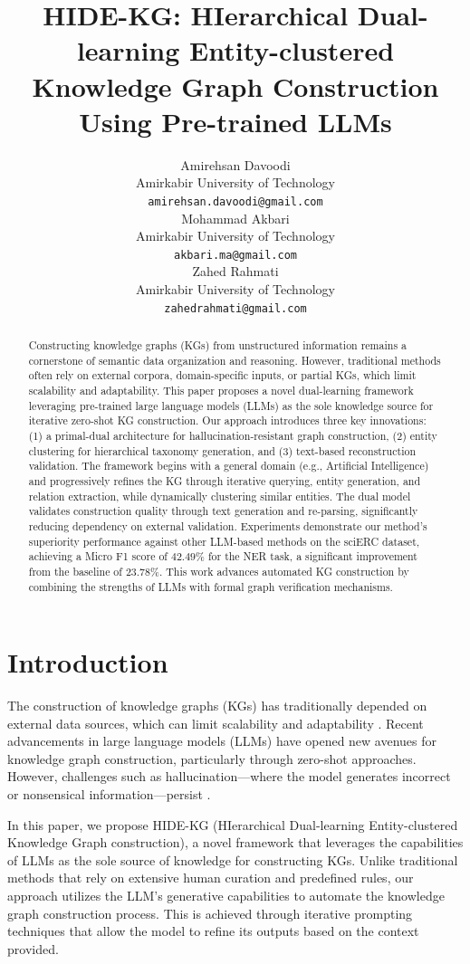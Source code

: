 \documentclass[11pt]{article}
\title{HIDE-KG: HIerarchical Dual-learning Entity-clustered Knowledge Graph Construction Using Pre-trained LLMs}
\author{Amirehsan Davoodi \\ 
  Amirkabir University of Technology \\ 
  \texttt{amirehsan.davoodi@gmail.com} \\\And
  Mohammad Akbari \\
  Amirkabir University of Technology \\
  \texttt{akbari.ma@gmail.com} \\\And
  Zahed Rahmati \\
  Amirkabir University of Technology \\
  \texttt{zahedrahmati@gmail.com} \\}
\begin{document}
\maketitle

\begin{abstract}
    Constructing knowledge graphs (KGs) from unstructured information remains a cornerstone of semantic data organization and reasoning. However, traditional methods often rely on external corpora, domain-specific inputs, or partial KGs, which limit scalability and adaptability. This paper proposes a novel dual-learning framework leveraging pre-trained large language models (LLMs) as the sole knowledge source for iterative zero-shot KG construction. Our approach introduces three key innovations: (1) a primal-dual architecture for hallucination-resistant graph construction, (2) entity clustering for hierarchical taxonomy generation, and (3) text-based reconstruction validation. The framework begins with a general domain (e.g., Artificial Intelligence) and progressively refines the KG through iterative querying, entity generation, and relation extraction, while dynamically clustering similar entities. The dual model validates construction quality through text generation and re-parsing, significantly reducing dependency on external validation. Experiments demonstrate our method's superiority performance against other LLM-based methods on the sciERC dataset, achieving a Micro F1 score of $42.49\%$ for the NER task, a significant improvement from the baseline of $23.78\%$. This work advances automated KG construction by combining the strengths of LLMs with formal graph verification mechanisms.
\end{abstract}

\section{Introduction}
The construction of knowledge graphs (KGs) has traditionally depended on external data sources, which can limit scalability and adaptability \cite{surveyKGConstruction2023}. Recent advancements in large language models (LLMs) have opened new avenues for knowledge graph construction, particularly through zero-shot approaches. However, challenges such as hallucination—where the model generates incorrect or nonsensical information—persist \cite{KGLLMHallucinations2025}.

In this paper, we propose HIDE-KG (HIerarchical Dual-learning Entity-clustered Knowledge Graph construction), a novel framework that leverages the capabilities of LLMs as the sole source of knowledge for constructing KGs. Unlike traditional methods that rely on extensive human curation and predefined rules, our approach utilizes the LLM's generative capabilities to automate the knowledge graph construction process. This is achieved through iterative prompting techniques that allow the model to refine its outputs based on the context provided.
\end{document}
